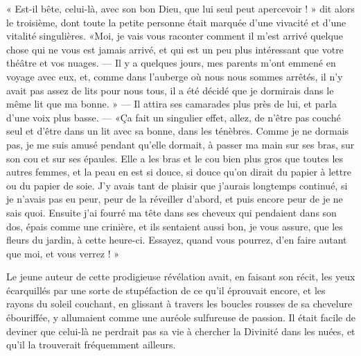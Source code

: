 « Est{}-il bête, celui{}-là, avec son bon Dieu, que lui seul peut
apercevoir ! » dit alors le troisième, dont toute la petite personne
était marquée d’une vivacité et d’une
vitalité singulières. «Moi, je vais vous raconter comment il
m’est arrivé quelque chose qui ne vous est jamais
arrivé, et qui est un peu plus intéressant que votre théâtre et vos
nuages. --- Il y a quelques jours, mes parents m’ont
emmené en voyage avec eux, et, comme dans l’auberge où
nous nous sommes arrêtés, il n’y avait pas assez de
lits pour nous tous, il a été décidé que je dormirais dans le même lit
que ma bonne. » --- Il attira ses camarades plus près de lui, et parla
d’une voix plus basse. --- «Ça fait un singulier effet,
allez, de n’être pas couché seul et
d’être dans un lit avec sa bonne, dans les ténèbres.
Comme je ne dormais pas, je me suis amusé pendant
qu’elle dormait, à passer ma main sur ses bras, sur
son cou et sur ses épaules. Elle a les bras et le cou bien plus gros
que toutes les autres femmes, et la peau en est si douce, si douce
qu’on dirait du papier à lettre ou du papier de soie.
J’y avais tant de plaisir que
j’aurais longtemps continué, si je
n’avais pas eu peur, peur de la réveiller
d’abord, et puis encore peur de je ne sais quoi.
Ensuite j’ai fourré ma tête dans ses cheveux qui
pendaient dans son dos, épais comme une crinière, et ils sentaient
aussi bon, je vous assure, que les fleurs du jardin, à cette
heure{}-ci. Essayez, quand vous pourrez, d’en faire
autant que moi, et vous verrez ! »

Le jeune auteur de cette prodigieuse révélation avait, en faisant son
récit, les yeux écarquillés par une sorte de stupéfaction de ce
qu’il éprouvait encore, et les rayons du soleil
couchant, en glissant à travers les boucles rousses de sa chevelure
ébouriffée, y allumaient comme une auréole sulfureuse de passion. Il
était facile de deviner que celui{}-là ne perdrait pas sa vie à
chercher la Divinité dans les nuées, et qu’il la
trouverait fréquemment ailleurs.

